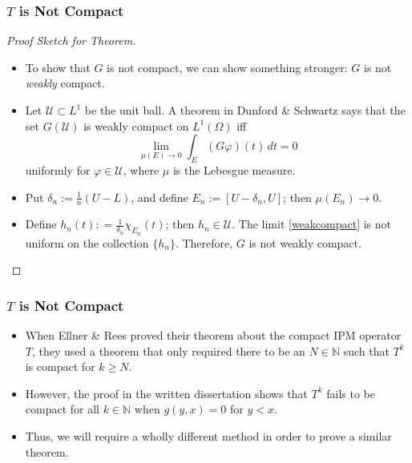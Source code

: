 \documentclass{beamer}
\newcommand{\N}{\mathbb{N}}
\newcommand{\dd}{{\delta}}
\begin{document}
\begin{frame}
	\frametitle{$T$ is Not Compact}
		\begin{proof}[Proof Sketch for Theorem]
			\begin{itemize}
			\item To show that $G$ is not compact, we can show something stronger: $G$ is not \emph{weakly} compact.
			\pause
			\item Let $\mathscr{U} \subset L^1$ be the unit ball. A theorem in Dunford \& Schwartz \cite{Dunford1958} says that the set $G(\mathscr{U})$ is weakly compact on $L^1(\Omega)$ iff
			\begin{equation}
				\lim_{\mu(E) \to 0} \int_E (G\varphi)(t) \, dt = 0 \label{weakcompact}
			\end{equation}
			uniformly for $\varphi \in \mathscr{U}$, where $\mu$ is the Lebesgue measure.
			\pause
			\item Put $\dd_n := \frac 1n (U-L)$, and define $E_n:= [U-\dd_n, U]$; then $\mu(E_n) \to 0$.
			\pause
			\item Define $h_n(t) : = \frac{1}{\dd_n} \chi_{E_n}(t)$; then $h_n \in \mathscr{U}$. The limit \eqref{weakcompact} is not uniform on the collection $\{h_n\}$. Therefore, $G$ is not weakly compact.
			\end{itemize}
		\end{proof}
\end{frame}

\begin{frame}
	\frametitle{$T$ is Not Compact}
	\begin{itemize}
		\item When Ellner \& Rees proved their theorem about the compact IPM operator $T$, they used a theorem that only required there to be an $N \in \N$ such that $T^k$ is compact for $k \geq N$.
		\pause
		\item However, the proof in the written dissertation shows that $T^k$ fails to be compact for all $k \in \N$ when $g(y, x) = 0$ for $y < x$.
		\pause
		\item Thus, we will require a wholly different method in order to prove a similar theorem.
	\end{itemize}
\end{frame}
\end{document}
